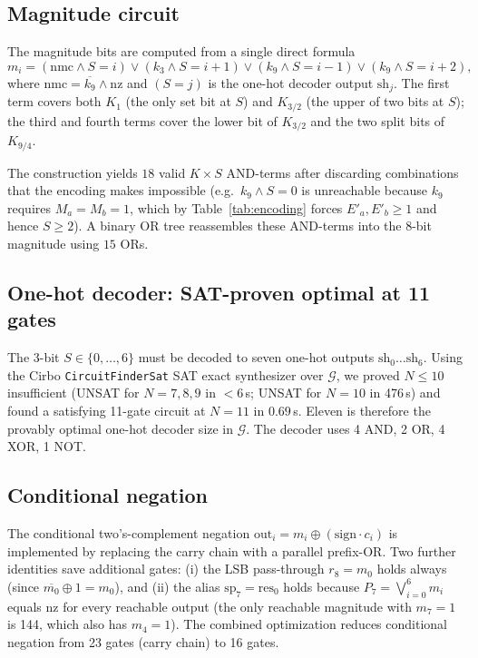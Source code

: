 \documentclass[11pt]{article}
\begin{document}
\subsection{Magnitude circuit}

The magnitude bits are computed from a single direct formula
\begin{equation}
  m_i = (\text{nmc}\wedge S{=}i)
        \vee (k_3 \wedge S{=}i{+}1)
        \vee (k_9 \wedge S{=}i{-}1)
        \vee (k_9 \wedge S{=}i{+}2),
  \label{eq:magformula}
\end{equation}
where $\text{nmc} = \overline{k_9}\wedge\text{nz}$ and
$(S{=}j)$ is the one-hot decoder output $\text{sh}_j$.
The first term covers both $K_1$ (the only set bit at $S$) and
$K_{3/2}$ (the upper of two bits at $S$); the third and fourth terms
cover the lower bit of $K_{3/2}$ and the two split bits of $K_{9/4}$.

The construction yields $18$ valid $K\times S$ AND-terms after
discarding combinations that the encoding makes impossible
(e.g.\ $k_9 \wedge S{=}0$ is unreachable because $k_9$ requires
$M_a = M_b = 1$, which by Table~\ref{tab:encoding} forces
$E'_a, E'_b \ge 1$ and hence $S \ge 2$).
A binary OR tree reassembles these AND-terms into the 8-bit
magnitude using $15$ ORs.

\subsection{One-hot decoder: SAT-proven optimal at 11 gates}

The 3-bit $S\in\{0,\ldots,6\}$ must be decoded to seven one-hot
outputs $\text{sh}_0\ldots\text{sh}_6$.
Using the Cirbo \texttt{CircuitFinderSat} SAT exact synthesizer
over $\mathcal{G}$, we proved $N\le 10$ insufficient
(UNSAT for $N=7,8,9$ in $<6$\,s; UNSAT for $N=10$ in 476\,s) and
found a satisfying 11-gate circuit at $N=11$ in $0.69$\,s.
Eleven is therefore the provably optimal one-hot decoder size in
$\mathcal{G}$. The decoder uses 4 AND, 2 OR, 4 XOR, 1 NOT.

\subsection{Conditional negation}

The conditional two's-complement negation
$\text{out}_i = m_i \oplus (\text{sign}\cdot c_i)$
is implemented by replacing the carry chain with a parallel prefix-OR.
Two further identities save additional gates: (i) the LSB pass-through
$r_8 = m_0$ holds always (since $\overline{m_0}\oplus 1 = m_0$), and
(ii) the alias $\text{sp}_7 = \text{res}_0$ holds because $P_7
= \bigvee_{i=0}^{6} m_i$ equals $\text{nz}$ for every reachable
output (the only reachable magnitude with $m_7 = 1$ is 144, which
also has $m_4 = 1$).
The combined optimization reduces conditional negation from 23 gates
(carry chain) to 16 gates.
\end{document}
